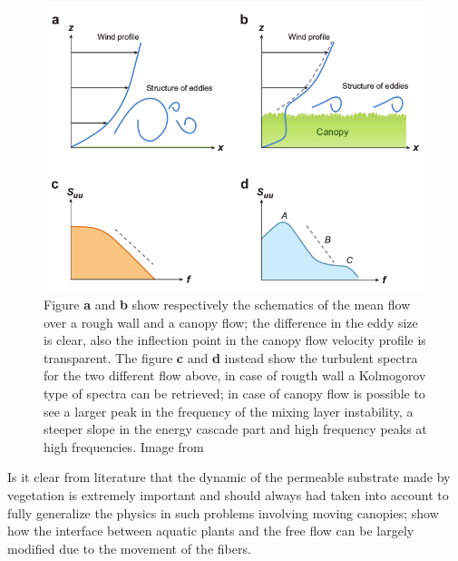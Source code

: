 \begin{figure}[h]
	\centering
	\includegraphics[width=0.7\linewidth]{chapter_1/spectra}
	\caption{Figure \textbf{a} and \textbf{b} show respectively the schematics of the mean flow over a rough wall and a canopy flow; the difference in the eddy size is clear, also the inflection point in the canopy flow velocity profile is transparent.
		The figure \textbf{c} and \textbf{d} instead show the turbulent spectra for the two different flow above, in case of rougth wall a Kolmogorov type of spectra can be retrieved; in case of canopy flow is possible to see  a larger peak in the frequency of the mixing layer instability, a steeper slope in the energy cascade part and high frequency peaks at high frequencies. Image from \citet{de2008effects}}
		\label{fig:spectra}
	\end{figure}

Is it clear from literature that the dynamic of the permeable substrate made by vegetation is extremely important and should always had taken into account to fully generalize the physics in such problems involving moving canopies; \citet{nepf2012flow} show how the interface between aquatic plants and the free flow can be largely modified due to the movement of the fibers.

